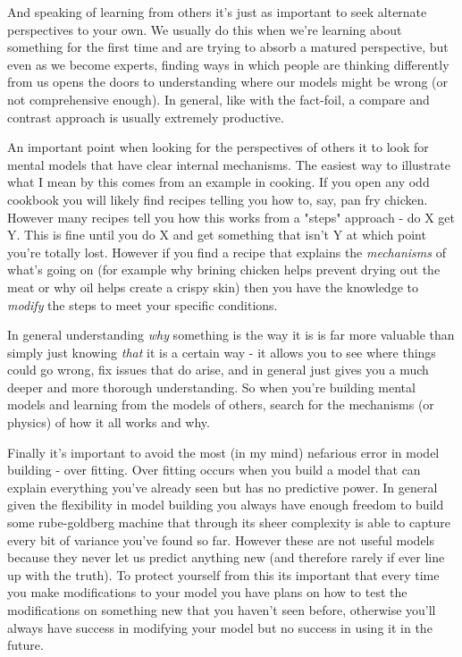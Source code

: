 \documentclass[11pt,a5paper]{book}
\begin{document}
And speaking of learning from others it's just as important to seek alternate perspectives to your own. We usually do this when we're learning about something for the first time and are trying to absorb a matured perspective, but even as we become experts, finding ways in which people are thinking differently from us opens the doors to understanding where our models might be wrong (or not comprehensive enough). In general, like with the fact-foil, a compare and contrast approach is usually extremely productive.
\newline

An important point when looking for the perspectives of others it to look for mental models that have clear internal mechanisms. The easiest way to illustrate what I mean by this comes from an example in cooking. If you open any odd cookbook you will likely find recipes telling you how to, say, pan fry chicken. However many recipes tell you how this works from a "steps" approach - do X get Y. This is fine until you do X and get something that isn't Y at which point you're totally lost. However if you find a recipe that explains the \textit{mechanisms} of what's going on (for example why brining chicken helps prevent drying out the meat or why oil helps create a crispy skin) then you have the knowledge to \textit{modify} the steps to meet your specific conditions. 
\newline

In general understanding \textit{why} something is the way it is is far more valuable than simply just knowing \textit{that} it is a certain way - it allows you to see where things could go wrong, fix issues that do arise, and in general just gives you a much deeper and more thorough understanding. So when you're building mental models and learning from the models of others, search for the mechanisms (or physics) of how it all works and why.
\newline

Finally it's important to avoid the most (in my mind) nefarious error in model building - over fitting. Over fitting occurs when you build a model that can explain everything you've already seen but has no predictive power. In general given the flexibility in model building you always have enough freedom to build some rube-goldberg machine that through its sheer complexity is able to capture every bit of variance you've found so far. However these are not useful models because they never let us predict anything new (and therefore rarely if ever line up with the truth). To protect yourself from this its important that every time you make modifications to your model you have plans on how to test the modifications on something new that you haven't seen before, otherwise you'll always have success in modifying your model but no success in using it in the future. 
\newline
\end{document}
